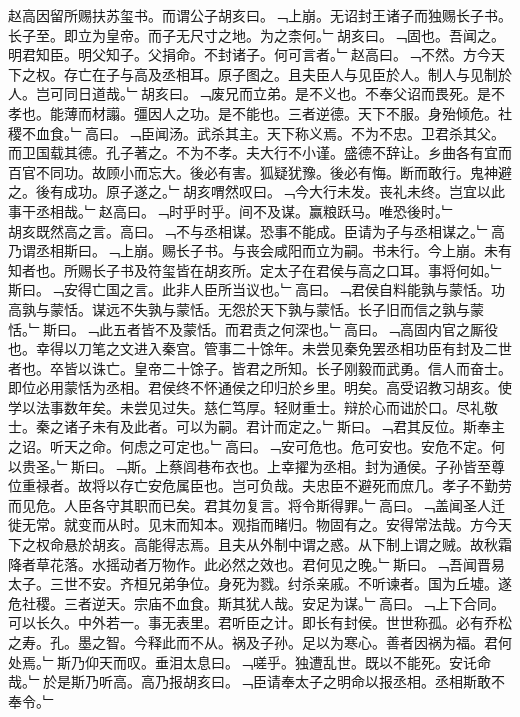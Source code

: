 \documentclass{zhvt-classic}
\begin{document}
\hspace*{2em}赵高因留所赐扶苏玺书。而谓公子胡亥曰。﹁上崩。无诏封王诸子而独赐长子书。长子至。即立为皇帝。而子无尺寸之地。为之柰何。﹂胡亥曰。﹁固也。吾闻之。明君知臣。明父知子。父捐命。不封诸子。何可言者。﹂赵高曰。﹁不然。方今天下之权。存亡在子与高及丞相耳。原子图之。且夫臣人与见臣於人。制人与见制於人。岂可同日道哉。﹂胡亥曰。﹁废兄而立弟。是不义也。不奉父诏而畏死。是不孝也。能薄而材譾。彊因人之功。是不能也。三者逆德。天下不服。身殆倾危。社稷不血食。﹂高曰。﹁臣闻汤。武杀其主。天下称义焉。不为不忠。卫君杀其父。而卫国载其德。孔子著之。不为不孝。夫大行不小谨。盛德不辞让。乡曲各有宜而百官不同功。故顾小而忘大。後必有害。狐疑犹豫。後必有悔。断而敢行。鬼神避之。後有成功。原子遂之。﹂胡亥喟然叹曰。﹁今大行未发。丧礼未终。岂宜以此事干丞相哉。﹂赵高曰。﹁时乎时乎。间不及谋。赢粮跃马。唯恐後时。﹂\\
\hspace*{2em}胡亥既然高之言。高曰。﹁不与丞相谋。恐事不能成。臣请为子与丞相谋之。﹂高乃谓丞相斯曰。﹁上崩。赐长子书。与丧会咸阳而立为嗣。书未行。今上崩。未有知者也。所赐长子书及符玺皆在胡亥所。定太子在君侯与高之口耳。事将何如。﹂斯曰。﹁安得亡国之言。此非人臣所当议也。﹂高曰。﹁君侯自料能孰与蒙恬。功高孰与蒙恬。谋远不失孰与蒙恬。无怨於天下孰与蒙恬。长子旧而信之孰与蒙恬。﹂斯曰。﹁此五者皆不及蒙恬。而君责之何深也。﹂高曰。﹁高固内官之厮役也。幸得以刀笔之文进入秦宫。管事二十馀年。未尝见秦免罢丞相功臣有封及二世者也。卒皆以诛亡。皇帝二十馀子。皆君之所知。长子刚毅而武勇。信人而奋士。即位必用蒙恬为丞相。君侯终不怀通侯之印归於乡里。明矣。高受诏教习胡亥。使学以法事数年矣。未尝见过失。慈仁笃厚。轻财重士。辩於心而诎於口。尽礼敬士。秦之诸子未有及此者。可以为嗣。君计而定之。﹂斯曰。﹁君其反位。斯奉主之诏。听天之命。何虑之可定也。﹂高曰。﹁安可危也。危可安也。安危不定。何以贵圣。﹂斯曰。﹁斯。上蔡闾巷布衣也。上幸擢为丞相。封为通侯。子孙皆至尊位重禄者。故将以存亡安危属臣也。岂可负哉。夫忠臣不避死而庶几。孝子不勤劳而见危。人臣各守其职而已矣。君其勿复言。将令斯得罪。﹂高曰。﹁盖闻圣人迁徙无常。就变而从时。见末而知本。观指而睹归。物固有之。安得常法哉。方今天下之权命悬於胡亥。高能得志焉。且夫从外制中谓之惑。从下制上谓之贼。故秋霜降者草花落。水摇动者万物作。此必然之效也。君何见之晚。﹂斯曰。﹁吾闻晋易太子。三世不安。齐桓兄弟争位。身死为戮。纣杀亲戚。不听谏者。国为丘墟。遂危社稷。三者逆天。宗庙不血食。斯其犹人哉。安足为谋。﹂高曰。﹁上下合同。可以长久。中外若一。事无表里。君听臣之计。即长有封侯。世世称孤。必有乔松之寿。孔。墨之智。今释此而不从。祸及子孙。足以为寒心。善者因祸为福。君何处焉。﹂斯乃仰天而叹。垂泪太息曰。﹁嗟乎。独遭乱世。既以不能死。安讬命哉。﹂於是斯乃听高。高乃报胡亥曰。﹁臣请奉太子之明命以报丞相。丞相斯敢不奉令。﹂\\
\end{document}
